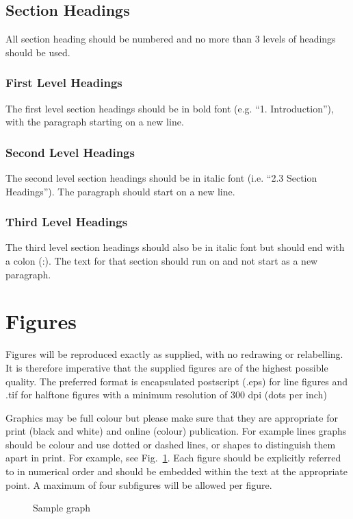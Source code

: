 \documentclass{ietperso}
\begin{document}
\begin{ietbody}
\subsection{Section Headings}
All section heading should be numbered and no more than 3 levels of headings should be used.

\subsubsection{First Level Headings}
The first level section headings should be in bold font (e.g. ``1. Introduction''), with the paragraph starting on a new line.

\subsubsection{Second Level Headings}
The second level section headings should be in italic font (i.e. ``2.3 Section Headings'').  The paragraph should start on a new line.

\subsubsection{Third Level Headings}
The third level section headings should also be in italic font but should end with a colon (:). The text for that section should run on and not start as a new paragraph.

\section{Figures}
Figures will be reproduced exactly as supplied, with no redrawing or relabelling. It is therefore imperative that the supplied figures are of the highest possible quality. The preferred format is encapsulated postscript (.eps) for line figures and .tif for halftone figures with a minimum resolution of 300 dpi (dots per inch)

Graphics may be full colour but please make sure that they are appropriate for print (black and white) and online (colour) publication. For example lines graphs should be colour and use dotted or dashed lines, or shapes to distinguish them apart in print. For example, see Fig.~\ref{fig:1}. Each figure should be explicitly referred to in numerical order and should be embedded within the text at the appropriate point. A maximum of four subfigures will be allowed per figure.

\begin{figure}
\centering
{}
\caption{\label{fig:1}Sample graph}
\end{figure}


\end{ietbody}
\end{document}
